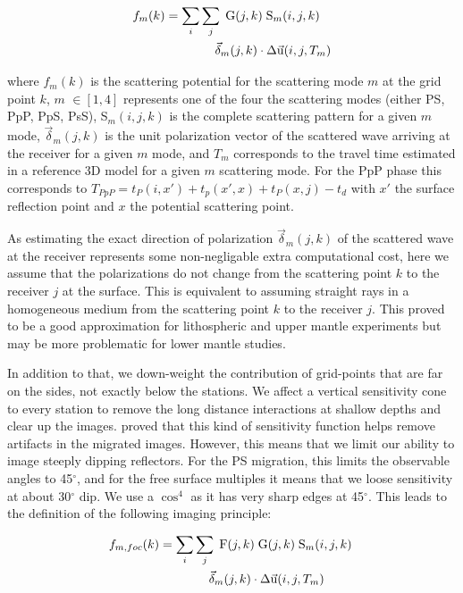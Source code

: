 \documentclass[9pt,a4paper]{article}
\numberwithin{equation}{section}
\begin{document}
\begin{multicols}{2}
\begin{align}
  f_{m}(k) &= \sum_i \sum_j \; \text{G}(j,k) \; \text{S}_{m}(i,j,k) \; \notag\\&\qquad\qquad \vec{\delta}_{m}(j,k) \cdot \Delta\vec{\text{u}}(i,j,T_m)
  \label{mod}
\end{align}
\vspace{1mm}

\noindent where $f_{m}(k)$ is the scattering potential for the scattering mode $m$ at the grid point $k$, 
$m$ $\in [1,4]$ represents one of the four the scattering modes (either PS, PpP, PpS, PsS), 
S$_m(i,j,k)$ is the complete scattering pattern for a given $m$ mode, 
$\vec{\delta}_m(j,k)$ is the unit polarization vector of the scattered wave arriving at the receiver for a given $m$ mode, 
and $T_m$ corresponds to the travel time estimated in a reference 3D model  for a given $m$ scattering mode.
For the PpP phase this corresponds to $T_{PpP} = t_P(i,x') + t_p(x',x) + t_P(x,j) - t_d$ with $x'$ the surface reflection point and $x$ the potential scattering point.

As estimating the exact direction of polarization $\vec{\delta}_m(j,k)$ of the scattered wave at the receiver represents some non-negligable extra computational cost, here we assume that the polarizations do not change from the scattering point $k$ to the receiver $j$ at the surface.
This is equivalent to assuming straight rays in a homogeneous medium from the scattering point $k$ to the receiver $j$.
This proved to be a good approximation for lithospheric and upper mantle experiments but may be more problematic for lower mantle studies. 

In addition to that, we down-weight the contribution of grid-points that are far on the sides, not exactly below the stations.
We affect a vertical sensitivity cone to every station to remove the long distance interactions at shallow depths and clear up the images.
\cite{cheng_gji_16} proved that this kind of sensitivity function helps remove artifacts in the migrated images.
However, this means that we limit our ability to image steeply dipping reflectors.
For the PS migration, this limits the observable angles to 45$^{\circ}$, and for the free surface multiples it means that we loose sensitivity at about 30$^{\circ}$ dip.
We use a $\cos^4$ as it has very sharp edges at 45$^{\circ}$.
This leads to the definition of the following imaging principle:

\begin{align}
  f_{m,foc}(k) &= \sum_i \sum_j \; \text{F}(j,k) \; \text{G}(j,k) \; \text{S}_{m}(i,j,k) \; \notag\\&\qquad\qquad \vec{\delta}_{m}(j,k) \cdot \Delta\vec{\text{u}}(i,j,T_m)
  \label{foc}
\end{align}
\vspace{1mm}


\end{multicols}
\end{document}
